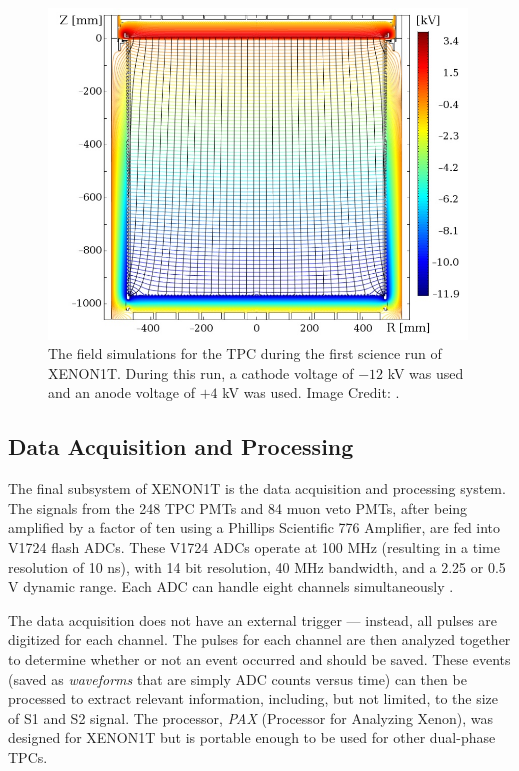 

\begin{figure}[t]
	\centering
	\includegraphics[width=0.99\textwidth]{xe1t_sr0_field_sim}
	\caption{The field simulations for the TPC during the first science run of XENON1T.  During this run, a cathode voltage of $-12$ kV was used and an anode voltage of $+4$ kV was used.  Image Credit: .}
	\label{fig:xe1t_sr0_field_sim}
\end{figure}


\subsection{Data Acquisition and Processing}
\label{sec:xe1t_daq_pax}

The final subsystem of XENON1T is the data acquisition and processing system.  The signals from the 248 TPC PMTs and 84 muon veto PMTs, after being amplified by a factor of ten using a Phillips Scientific 776 Amplifier, are fed into V1724 flash ADCs.  These V1724 ADCs operate at 100 MHz (resulting in a time resolution of 10 ns), with 14 bit resolution, 40 MHz bandwidth, and a 2.25 or 0.5 V dynamic range.   Each ADC can handle eight channels simultaneously \cite{caen2017v1724}.  

The data acquisition does not have an external trigger --- instead, all pulses are digitized for each channel.  The pulses for each channel are then analyzed together to determine whether or not an event occurred and should be saved.  These events (saved as \textit{waveforms} that are simply ADC counts versus time) can then be processed to extract relevant information, including, but not limited, to the size of S1 and S2 signal.  The processor, \textit{PAX} (Processor for Analyzing Xenon), was designed for XENON1T but is portable enough to be used for other dual-phase TPCs. %

